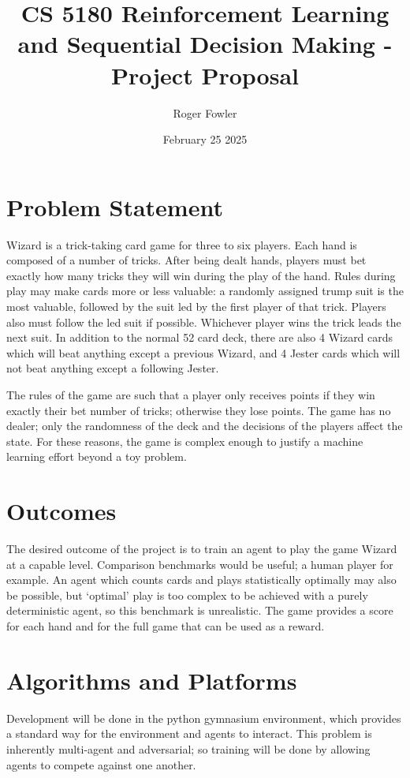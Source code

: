 \documentclass[10pt]{article} %
\title{\vspace{-2cm}CS 5180 Reinforcement Learning and Sequential Decision Making - Project Proposal}
\author{Roger Fowler}
\date{February 25 2025}
\begin{document}
\maketitle

\section{Problem Statement}

Wizard is a trick-taking card game for three to six players. Each hand is composed of a number of tricks. After being dealt hands, players must bet exactly how many tricks they will win during the play of the hand. Rules during play may make cards more or less valuable: a randomly assigned trump suit is the most valuable, followed by the suit led by the first player of that trick. Players also must follow the led suit if possible. Whichever player wins the trick leads the next suit. In addition to the normal 52 card deck, there are also 4 Wizard cards which will beat anything except a previous Wizard, and 4 Jester cards which will not beat anything except a following Jester.

The rules of the game are such that a player only receives points if they win exactly their bet number of tricks; otherwise they lose points. The game has no dealer; only the randomness of the deck and the decisions of the players affect the state. For these reasons, the game is complex enough to justify a machine learning effort beyond a toy problem.

\section{Outcomes}

The desired outcome of the project is to train an agent to play the game Wizard at a capable level. Comparison benchmarks would be useful; a human player for example. An agent which counts cards and plays statistically optimally may also be possible, but ‘optimal’ play is too complex to be achieved with a purely deterministic agent, so this benchmark is unrealistic. The game provides a score for each hand and for the full game that can be used as a reward.

\section{Algorithms and Platforms}

Development will be done in the python gymnasium environment, which provides a standard way for the environment and agents to interact. This problem is inherently multi-agent and adversarial; so training will be done by allowing agents to compete against one another.
\end{document}
